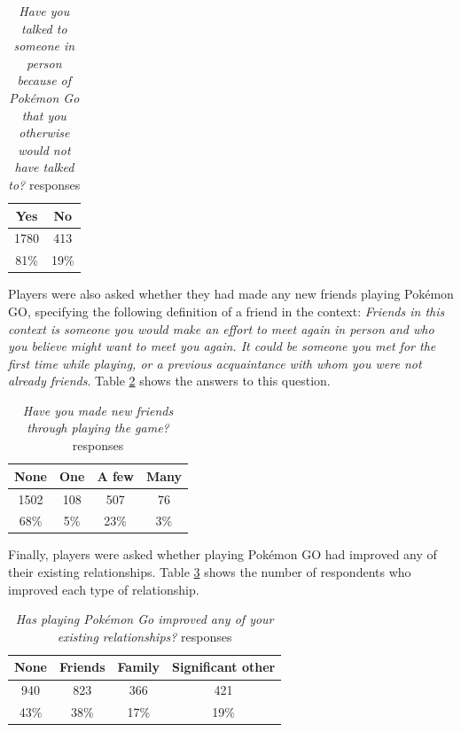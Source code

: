 \begin{table}[h]
	\centering
	\caption{\emph{Have you talked to someone in person because of Pokémon Go that you otherwise would not have talked to?} responses}
	\label{tbl:talk-to-strangers}
	\begin{tabular}{|c|c|}
		\hline
		\textbf{Yes}	& \textbf{No}\\
		\hline\hline
		1780			& 413\\
		81\%			& 19\%\\\hline
	\end{tabular}
\end{table}

Players were also asked whether they had made any new friends playing Pokémon GO, specifying the following definition of a friend in the context: \emph{Friends in this context is someone you would make an effort to meet again in person and who you believe might want to meet you again. It could be someone you met for the first time while playing, or a previous acquaintance with whom you were not already friends}. Table \ref{tbl:new-friends} shows the answers to this question.

\begin{table}[h]
	\centering
	\caption{\emph{Have you made new friends through playing the game?} responses}
	\label{tbl:new-friends}
	\begin{tabular}{|c|c|c|c|}
		\hline
		\textbf{None}	& \textbf{One}	& \textbf{A few}	& \textbf{Many}\\
		\hline\hline
		1502			& 108			& 507				& 76\\
		68\%			& 5\%			& 23\%				& 3\%\\\hline
	\end{tabular}
\end{table}

Finally, players were asked whether playing Pokémon GO had improved any of their existing relationships. Table \ref{tbl:existing-relationships} shows the number of respondents who improved each type of relationship.

\begin{table}[h]
	\centering
	\caption{\emph{Has playing Pokémon Go improved any of your existing relationships?} responses}
	\label{tbl:existing-relationships}
	\begin{tabular}{|c|c|c|c|}
		\hline
		\textbf{None} & \textbf{Friends}& \textbf{Family}	& \textbf{Significant other}\\
		\hline\hline
		940			& 823				& 366				& 421\\
		43\%		& 38\%				& 17\%				& 19\%\\\hline
	\end{tabular}
\end{table}

